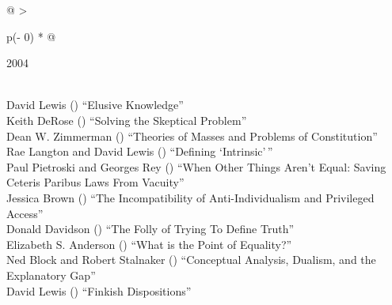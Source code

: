 \documentclass[
  10pt,
  letterpaper,
  DIV=11,
  numbers=noendperiod,
  twoside]{scrartcl}
\begin{document}
\begin{longtable}[]{@{}
  >{\raggedright\arraybackslash}p{(\columnwidth - 0\tabcolsep) * }@{}}

\caption{\label{tbl-top-ten-1995}Most cited articles published less than
ten years ago as of 2004.}

\tabularnewline

\toprule\noalign{}
\begin{minipage}[b]{\linewidth}\raggedright
2004
\end{minipage} \\
\midrule\noalign{}
\endhead
\bottomrule\noalign{}
\endlastfoot
David Lewis
()
``Elusive Knowledge'' \\
Keith DeRose
()
``Solving the Skeptical Problem'' \\
Dean W. Zimmerman
()
``Theories of Masses and Problems of Constitution'' \\
Rae Langton and David Lewis
()
``Defining `Intrinsic'\,'' \\
Paul Pietroski and Georges Rey
()
``When Other Things Aren't Equal: Saving Ceteris Paribus Laws From
Vacuity'' \\
Jessica Brown
()
``The Incompatibility of Anti-Individualism and Privileged Access'' \\
Donald Davidson
()
``The Folly of Trying To Define Truth'' \\
Elizabeth S. Anderson
()
``What is the Point of Equality?'' \\
Ned Block and Robert Stalnaker
()
``Conceptual Analysis, Dualism, and the Explanatory Gap'' \\
David Lewis
()
``Finkish Dispositions'' \\

\end{longtable}
\end{document}
